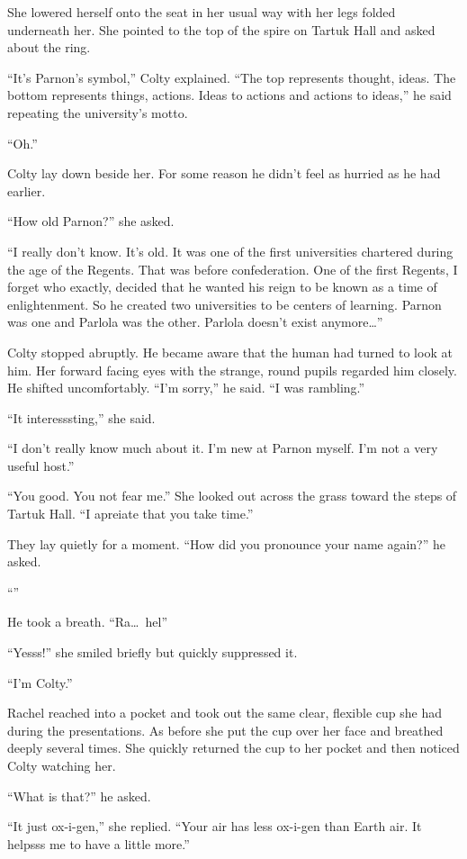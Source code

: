 She lowered herself onto the seat in her usual way with her legs folded underneath her. She
pointed to the top of the spire on Tartuk Hall and asked about the ring.

``It's Parnon's symbol,'' Colty explained. ``The top represents thought, ideas. The bottom
represents things, actions. Ideas to actions and actions to ideas,'' he said repeating the
university's motto.

``Oh.''

Colty lay down beside her. For some reason he didn't feel as hurried as he had earlier. 

``How old Parnon?'' she asked.

``I really don't know. It's old. It was one of the first universities chartered during the age
of the Regents. That was before confederation. One of the first Regents, I forget who exactly,
decided that he wanted his reign to be known as a time of enlightenment. So he created two
universities to be centers of learning. Parnon was one and Parlola was the other. Parlola
doesn't exist anymore\ldots''

Colty stopped abruptly. He became aware that the human had turned to look at him. Her forward
facing eyes with the strange, round pupils regarded him closely. He shifted uncomfortably. ``I'm
sorry,'' he said. ``I was rambling.''

``It interesssting,'' she said.

``I don't really know much about it. I'm new at Parnon myself. I'm not a very useful host.''

``You good. You not fear me.'' She looked out across the grass toward the steps of Tartuk Hall.
``I apreiate that you take time.''

They lay quietly for a moment. ``How did you pronounce your name again?'' he asked.

``''

He took a breath. ``Ra\ldots\ hel''

``Yesss!'' she smiled briefly but quickly suppressed it.

``I'm Colty.''

Rachel reached into a pocket and took out the same clear, flexible cup she had during the
presentations. As before she put the cup over her face and breathed deeply several times. She
quickly returned the cup to her pocket and then noticed Colty watching her.

``What is that?'' he asked.

``It just ox-i-gen,'' she replied. ``Your air has less ox-i-gen than Earth air. It helpsss me to
have a little more.''

